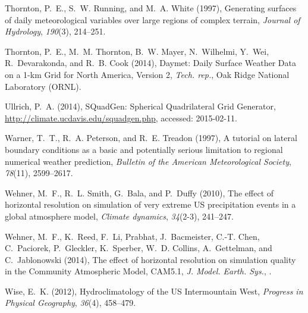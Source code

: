 \documentclass[ms,draft]{agutex}   %
\begin{document}
\begin{article}
\begin{thebibliography}{84}
Thornton, P.~E., S.~W. Running, and M.~A. White (1997), Generating surfaces of
  daily meteorological variables over large regions of complex terrain,
  \textit{Journal of Hydrology}, \textit{190}(3), 214--251.

Thornton, P.~E., M.~M. Thornton, B.~W. Mayer, N.~Wilhelmi, Y.~Wei,
  R.~Devarakonda, and R.~B. Cook (2014), {Daymet: Daily Surface Weather Data on
  a 1-km Grid for North America, Version 2}, \textit{Tech. rep.}, Oak Ridge
  National Laboratory (ORNL).

Ullrich, P.~A. (2014), {SQuadGen: Spherical Quadrilateral Grid Generator},
  \url{http://climate.ucdavis.edu/squadgen.php}, accessed: 2015-02-11.

Warner, T.~T., R.~A. Peterson, and R.~E. Treadon (1997), A tutorial on lateral
  boundary conditions as a basic and potentially serious limitation to regional
  numerical weather prediction, \textit{Bulletin of the American Meteorological
  Society}, \textit{78}(11), 2599--2617.

Wehner, M.~F., R.~L. Smith, G.~Bala, and P.~Duffy (2010), {The effect of
  horizontal resolution on simulation of very extreme US precipitation events
  in a global atmosphere model}, \textit{Climate dynamics}, \textit{34}(2-3),
  241--247.

Wehner, M.~F., K.~Reed, F.~Li, Prabhat, J.~Bacmeister, C.-T. Chen, C.~Paciorek,
  P.~Gleckler, K.~Sperber, W.~D. Collins, A.~Gettelman, and C.~Jablonowski
  (2014), {The effect of horizontal resolution on simulation quality in the
  Community Atmospheric Model, CAM5.1}, \textit{J. Model. Earth. Sys.},
  .

Wise, E.~K. (2012), {Hydroclimatology of the US Intermountain West},
  \textit{Progress in Physical Geography}, \textit{36}(4), 458--479.


\end{thebibliography}
\end{article}
\end{document}
